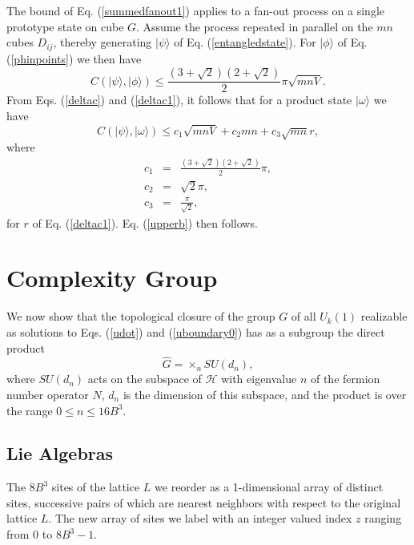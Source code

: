 \documentclass[twocolumn,amsmath,amssymb]{revtex4-1}
\begin{document}
The bound of Eq. (\ref{summedfanout1}) applies to a fan-out process on a 
single prototype state on cube $G$. Assume the process repeated in parallel on the
$mn$ cubes $D_{ij}$, thereby generating $|\psi \rangle $ of Eq. (\ref{entangledstate}).
For $|\phi \rangle $ of Eq. (\ref{phinpoints}) we then have
\begin{equation}
\label{psiphi}
C( |\psi \rangle , |\phi \rangle ) \le  \frac{(3 + \sqrt{2})(2+\sqrt{2})}{2} \pi \sqrt{mnV}.
\end{equation}
From Eqs. (\ref{deltac}) and (\ref{deltac1}), it follows that for a product state
$|\omega \rangle $ we have
\begin{equation}
\label{psiomega}
C(|\psi \rangle ,|\omega \rangle ) \le c_1 \sqrt{ mnV} + c_2 m n + c_3 \sqrt{mn} r, 
\end{equation}
where
\begin{subequations}
\begin{eqnarray}
\label{defc1}
c_1 & =&\frac{(3 + \sqrt{2})(2 + \sqrt{2})}{2} \pi  , \\
\label{defc2}
c_2 & = & \sqrt{2} \pi, \\
\label{defc32}
c_3 & = & \frac{\pi}{\sqrt{2}}, 
\end{eqnarray}
\end{subequations}
for $r$ of Eq. (\ref{deltac1}).
Eq. (\ref{upperb}) then follows. 



\section{\label{app:complexitygroup} Complexity Group}

We now show
that the topological closure of the group $G$ of all $U_k( 1)$ realizable as solutions to Eqs. (\ref{udot}) and
(\ref{uboundary0}) has as a subgroup the direct product
\begin{equation}
\label{formofga}
\hat{G} = \times_n SU(d_n),
\end{equation}
where $SU(d_n)$ acts on the subspace of $\mathcal{H}$
with eigenvalue $n$ of the fermion number operator $N$, 
$d_n$ is the dimension of this subspace, and
the product
is over the range $ 0 \le n \le 16 B^3$.

\subsection{\label{app:liealgebras} Lie Algebras}

The $8 B^3$ sites of the lattice $L$ we reorder as a 1-dimensional
array of distinct sites, successive pairs of which are 
nearest neighbors with respect to the original lattice $L$. 
The new array of sites we label with an integer valued index $z$
ranging from 0 to $8 B^3 -1$. 
\end{document}
